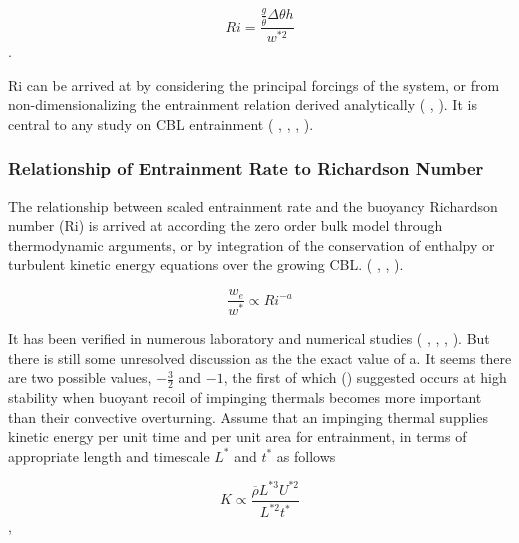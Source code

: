 \begin{equation}
Ri = \frac{\frac{g}{\overline{\theta}} \Delta \theta h}{w^{*2}}
\end{equation}.

\acs{Ri} can be arrived at by considering the principal forcings of the system, or from non-dimensionalizing the entrainment relation  derived analytically (\citeauthor{Tennekes73}  \citeyear{Tennekes73}, \citeauthor{Deardorff72} \citeyear{Deardorff72}). It is central to any study on \acs{CBL} entrainment (\citeauthor{SullMoengStev} \citeyear{SullMoengStev}, \citeauthor{FedConzMir04} \citeyear{FedConzMir04}, \citeauthor{Traum11} \citeyear{Traum11}, \citeauthor{BrooksFowler2} \citeyear{BrooksFowler2}).

\subsubsection{Relationship of Entrainment Rate to Richardson Number}

The relationship between scaled entrainment rate and the buoyancy Richardson number (\acs{Ri}) is arrived at according the zero order bulk
model through thermodynamic arguments, or by integration of the conservation of enthalpy or turbulent kinetic energy equations
over the growing \acs{CBL}. (\citeauthor{Tennekes73} \cite{Tennekes73}, \citeauthor{Deardorff79} \cite{Deardorff79}, 
\citeauthor{FedConzMir04} \cite{FedConzMir04}). 

\begin{equation}
\frac{w_{e}}{w^{*}} \propto  Ri^{-a}
\end{equation}

It has been verified in numerous laboratory and numerical studies (\citeauthor{DearWill80} \cite{DearWill80}, \citeauthor{SullMoengStev} \cite{SullMoengStev}, \citeauthor{FedConzMir04} \cite{FedConzMir04}, \citeauthor{BrooksFowler2} \cite{BrooksFowler2}).  But there is still some 
unresolved discussion as the the exact value of a.  It seems there are two possible values, $-\frac{3}{2}$ and $-1$, the first of which \citeauthor{EllTurn} (\citeyear{EllTurn}) suggested occurs at high stability when buoyant recoil of impinging thermals becomes more important than their convective overturning. Assume that an impinging thermal supplies kinetic energy per unit time and per unit area for entrainment, in terms of appropriate length and timescale $L^{*}$ and $t^{*}$ as follows 

\begin{equation}
K \propto \frac{\overline{\rho} L^{*3} U^{*2}}{L^{*2} t^{*}}
\end{equation},

